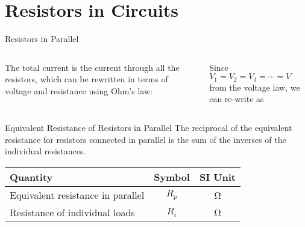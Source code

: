 \documentclass[12pt,aspectratio=169]{beamer}
\begin{document}
\section{Resistors in Circuits}

\begin{frame}{Resistors in Parallel}
  \begin{columns}
    
    The total current is the current through all the resistors, which can be
    rewritten in terms of voltage and resistance using Ohm's law:

    
    Since $V_1=V_2=V_3=\cdots=V$ from the voltage law, we can re-write as

  \end{columns}
\end{frame}



\begin{frame}{Equivalent Resistance of Resistors in Parallel} 
  The reciprocal of the equivalent resistance for resistors connected in
  parallel is the sum of the inverses of the individual resistances.

  \begin{center}
    \begin{tabular}{l|c|c}
      \rowcolor{pink}
      \textbf{Quantity} & \textbf{Symbol} & \textbf{SI Unit} \\ \hline
      Equivalent resistance in parallel & $R_p$ & \si\ohm \\
      Resistance of individual loads    & $R_i$ & \si\ohm
    \end{tabular}
  \end{center}
\end{frame}
\end{document}
